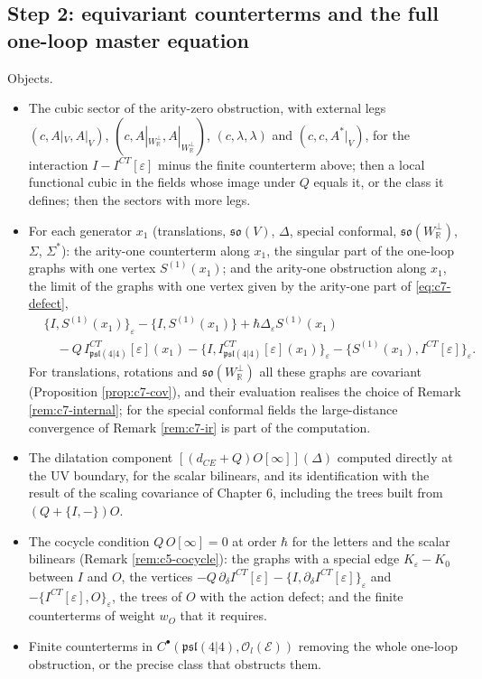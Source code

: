 \subsection{Step 2: equivariant counterterms and the full one-loop master equation}

Objects.
\begin{itemize}
\item The cubic sector of the arity-zero obstruction, with external legs $(c,A|_V,A|_V)$, $(c,A|_{W_{\mathbb R}^\perp},A|_{W_{\mathbb R}^\perp})$, $(c,\lambda,\lambda)$ and $(c,c,A^*|_V)$, for the interaction $I-I^{CT}[\varepsilon]$ minus the finite counterterm above; then a local functional cubic in the fields whose image under $Q$ equals it, or the class it defines; then the sectors with more legs.
\item For each generator $x_1$ (translations, $\mathfrak{so}(V)$, $\Delta$, special conformal, $\mathfrak{so}(W_{\mathbb R}^\perp)$, $\Sigma$, $\Sigma^*$): the arity-one counterterm along $x_1$, the singular part of the one-loop graphs with one vertex $S^{(1)}(x_1)$; and the arity-one obstruction along $x_1$, the limit of the graphs with one vertex given by the arity-one part of \eqref{eq:c7-defect},
\[
\begin{aligned}
&\{I,S^{(1)}(x_1)\}_\varepsilon-\{I,S^{(1)}(x_1)\}+\hbar\Delta_\varepsilon S^{(1)}(x_1)\\
&\quad-Q\,I^{CT}_{\mathfrak{psl}(4|4)}[\varepsilon](x_1)-\{I,I^{CT}_{\mathfrak{psl}(4|4)}[\varepsilon](x_1)\}_\varepsilon-\{S^{(1)}(x_1),I^{CT}[\varepsilon]\}_\varepsilon .
\end{aligned}
\]
For translations, rotations and $\mathfrak{so}(W_{\mathbb R}^\perp)$ all these graphs are covariant (Proposition \ref{prop:c7-cov}), and their evaluation realises the choice of Remark \ref{rem:c7-internal}; for the special conformal fields the large-distance convergence of Remark \ref{rem:c7-ir} is part of the computation.
\item The dilatation component $[(d_{CE}+Q)O[\infty]](\Delta)$ computed directly at the UV boundary, for the scalar bilinears, and its identification with the result of the scaling covariance of Chapter 6, including the trees built from $(Q+\{I,-\})O$.
\item The cocycle condition $Q\,O[\infty]=0$ at order $\hbar$ for the letters and the scalar bilinears (Remark \ref{rem:c5-cocycle}): the graphs with a special edge $K_\varepsilon-K_0$ between $I$ and $O$, the vertices $-Q\,\partial_\delta I^{CT}[\varepsilon]-\{I,\partial_\delta I^{CT}[\varepsilon]\}_\varepsilon$ and $-\{I^{CT}[\varepsilon],O\}_\varepsilon$, the trees of $O$ with the action defect; and the finite counterterms of weight $w_O$ that it requires.
\item Finite counterterms in $C^\bullet(\mathfrak{psl}(4|4),\mathscr O_l(\mathscr E))$ removing the whole one-loop obstruction, or the precise class that obstructs them.
\end{itemize}

